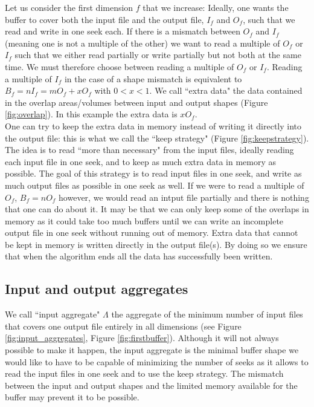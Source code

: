 \documentclass[conference]{IEEEtran}
\begin{document}
Let us consider the first dimension $f$ that we increase: Ideally, one wants the buffer to cover both the input file and the output file, $I_f$ and $O_f$, such that we read and write in one seek each.
If there is a mismatch between $O_f$ and $I_f$ (meaning one is not a multiple of the other) we want to read a multiple of $O_f$ or $I_f$ such that we either read partially or write partially but not both at the same time.
We must therefore choose between reading a multiple of $O_f$ or $I_f$.
Reading a multiple of $I_f$ in the case of a shape mismatch is equivalent to $B_f = nI_f = mO_f+xO_f$ with $0<x<1$.
We call ``extra data" the data contained in the overlap areas/volumes between input and output shapes (Figure \ref{fig:overlap}).
In this example the extra data is $xO_f$. \\

One can try to keep the extra data in memory instead of writing it directly into the output file: this is what we call the ``keep strategy" (Figure \ref{fig:keepstrategy}).
The idea is to read ``more than necessary" from the input files, ideally reading each input file in one seek, and to keep as much extra data in memory as possible.
The goal of this strategy is to read input files in one seek, and write as much output files as possible in one seek as well.
If we were to read a multiple of $O_f$, $B_f = nO_f$ however, we would read an intput file partially and there is nothing that one can do about it.
It may be that we can only keep some of the overlaps in memory as it could take too much buffers until we can write an incomplete output file in one seek without running out of memory.
Extra data that cannot be kept in memory is written directly in the output file(s).
By doing so we ensure that when the algorithm ends all the data has successfully been written.

\subsection{Input and output aggregates}
We call ``input aggregate" $\Lambda$ the aggregate of the minimum number of input files that covers one output file entirely in all dimensions (see Figure \ref{fig:input_aggregates}, Figure \ref{fig:firstbuffer}).
Although it will not always possible to make it happen, the input aggregate is the minimal buffer shape we would like to have to be capable of minimizing the number of seeks as it allows to read the input files in one seek and to use the keep strategy.
The mismatch between the input and output shapes and the limited memory available for the buffer may prevent it to be possible. \\
\end{document}
